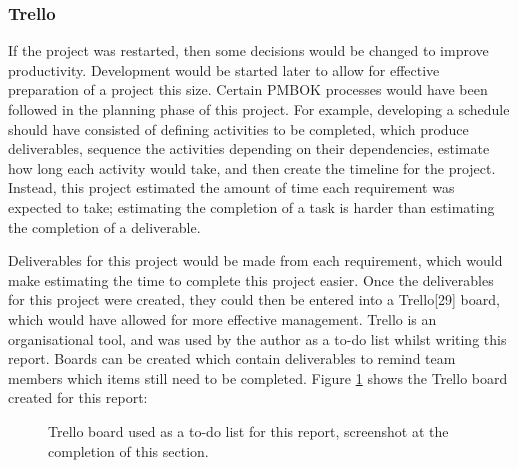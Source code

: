 \documentclass{article}
\begin{document}
\subsubsection{Trello}

If the project was restarted, then some decisions would be changed to improve productivity. Development would be started later to allow for effective preparation of a project this size. Certain PMBOK processes would have been followed in the planning phase of this project. For example, developing a schedule should have consisted of defining activities to be completed, which produce deliverables, sequence the activities depending on their dependencies, estimate how long each activity would take, and then create the timeline for the project. Instead, this project estimated the amount of time each requirement was expected to take; estimating the completion of a task is harder than estimating the completion of a deliverable. \par

Deliverables for this project would be made from each requirement, which would make estimating the time to complete this project easier. Once the deliverables for this project were created, they could then be entered into a Trello[29] board, which would have allowed for more effective management. Trello is an organisational tool, and was used by the author as a to-do list whilst writing this report. Boards can be created which contain deliverables to remind team members which items still need to be completed. Figure \ref{figure:trelloBoard} shows the Trello board created for this report: 

\begin{figure}[H]
	\centering
	\caption{Trello board used as a to-do list for this report, screenshot at the completion of this section.}
	\label{figure:trelloBoard}
\end{figure}
\end{document}
